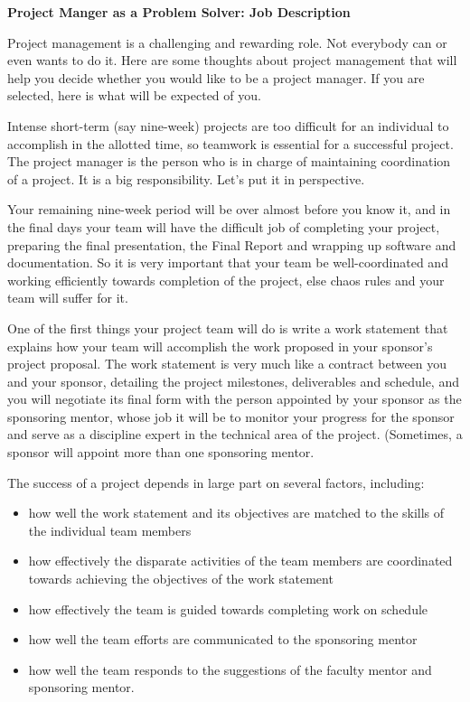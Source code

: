 \documentclass[12pt]{article}
\begin{document}
\vskip0.25in

\begin{center}
    {\bf Project Manger as a Problem Solver: Job Description}
\end{center}

Project management is a challenging and rewarding role. Not everybody can or
even wants to do it. Here are some thoughts about project management
that will help you decide whether you would like to be a project manager. If
you are selected, here is what will be expected of you.

Intense short-term (say nine-week) projects are too difficult for an
individual to accomplish in the
allotted time, so teamwork is essential for a successful project. The project
manager is the person who is in charge of maintaining coordination of a
project. It is a big responsibility. Let’s put it in perspective.


Your remaining nine-week period will be over almost before you know it, and in the
final days your team will have the difficult job of completing your 
project, preparing the final presentation, the Final Report
and wrapping up software and documentation. So it is very important that your
team be well-coordinated and working efficiently towards completion of the
project, else chaos rules and your team will suffer for it.

One of the first things your project team will do is write a work statement
that explains how your team will accomplish the work proposed in your
sponsor's project proposal. The work statement is very much like a contract
between you and your sponsor, detailing the project milestones, deliverables
and schedule, and you will negotiate its final form with the person appointed
by your sponsor as the sponsoring mentor, whose job it will be to monitor your
progress for the sponsor and serve as a discipline expert in the technical
area of the project. (Sometimes, a sponsor will appoint more than one
sponsoring mentor.

The success of a project depends in large part on several factors, including:
\begin{itemize}
    \item how well the work statement and its objectives are matched to the skills of the individual team members
    \item how effectively the disparate activities of the team members are coordinated towards achieving the objectives of the work statement
    \item how effectively the team is guided towards completing work on schedule
    \item how well the team efforts are communicated to the sponsoring mentor
    \item how well the team responds to the suggestions of the faculty mentor and sponsoring mentor.
\end{itemize}
\end{document}
